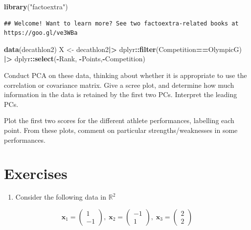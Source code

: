 \documentclass[
]{book}
\newenvironment{Shaded}{\begin{snugshade}}{\end{snugshade}}
\newcommand{\FunctionTok}[1]{\textcolor[rgb]{0.13,0.29,0.53}{\textbf{#1}}}
\newcommand{\NormalTok}[1]{#1}
\newcommand{\OtherTok}[1]{\textcolor[rgb]{0.56,0.35,0.01}{#1}}
\newcommand{\SpecialCharTok}[1]{\textcolor[rgb]{0.81,0.36,0.00}{\textbf{#1}}}
\newcommand{\StringTok}[1]{\textcolor[rgb]{0.31,0.60,0.02}{#1}}
\providecommand{\tightlist}{%
  \setlength{\itemsep}{0pt}\setlength{\parskip}{0pt}}
\theoremstyle{definition}
\theoremstyle{definition}
\theoremstyle{definition}
\theoremstyle{definition}
\theoremstyle{remark}
\begin{document}
\begin{Shaded}
\begin{Highlighting}[]
\FunctionTok{library}\NormalTok{(}\StringTok{"factoextra"}\NormalTok{)}
\end{Highlighting}
\end{Shaded}

\begin{verbatim}
## Welcome! Want to learn more? See two factoextra-related books at https://goo.gl/ve3WBa
\end{verbatim}

\begin{Shaded}
\begin{Highlighting}[]
\FunctionTok{data}\NormalTok{(decathlon2)}
\NormalTok{X }\OtherTok{\textless{}{-}}\NormalTok{ decathlon2}\SpecialCharTok{|\textgreater{}}\NormalTok{ dplyr}\SpecialCharTok{::}\FunctionTok{filter}\NormalTok{(Competition}\SpecialCharTok{==}\StringTok{\textquotesingle{}OlympicG\textquotesingle{}}\NormalTok{) }\SpecialCharTok{|\textgreater{}}\NormalTok{ dplyr}\SpecialCharTok{::}\FunctionTok{select}\NormalTok{(}\SpecialCharTok{{-}}\NormalTok{Rank, }\SpecialCharTok{{-}}\NormalTok{Points,}\SpecialCharTok{{-}}\NormalTok{Competition)}
\end{Highlighting}
\end{Shaded}

Conduct PCA on these data, thinking about whether it is appropriate to use the correlation or covariance matrix. Give a scree plot, and determine how much information in the data is retained by the first two PCs.
Interpret the leading PCs.

Plot the first two scores for the different athlete performances, labelling each point. From these plots, comment on particular strengths/weaknesses in some performances.

\hypertarget{exercises-1}{%
\section{Exercises}\label{exercises-1}}

\begin{enumerate}
\def\labelenumi{\arabic{enumi}.}
\tightlist
\item
  Consider the following data in \(\mathbb{R}^2\)
\end{enumerate}

\[\mathbf x_1 =\begin{pmatrix}1\\-1\end{pmatrix},\; \mathbf x_2 =\begin{pmatrix}-1\\1\end{pmatrix},
\;\mathbf x_3 =\begin{pmatrix}2\\2\end{pmatrix}\]
\end{document}
